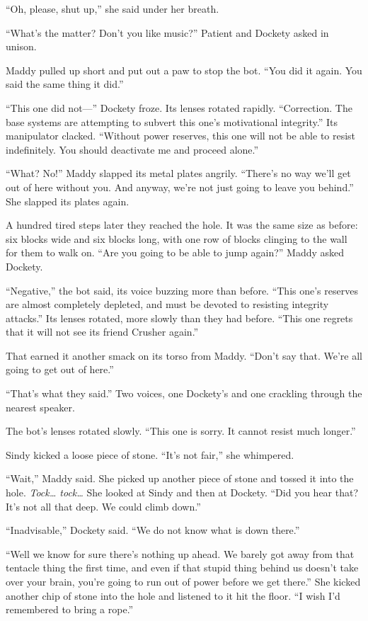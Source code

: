 \documentclass[10pt]{article}
\begin{document}
``Oh, please, shut up,'' she said under her breath.

``What's the matter? Don't you like music?'' Patient and Dockety asked
in unison.

Maddy pulled up short and put out a paw to stop the bot. ``You did it
again. You said the same thing it did.''

``This one did not---'' Dockety froze. Its lenses rotated rapidly.
``Correction. The base systems are attempting to subvert this one's
motivational integrity.'' Its manipulator clacked. ``Without power
reserves, this one will not be able to resist indefinitely. You should
deactivate me and proceed alone.''

``What? No!'' Maddy slapped its metal plates angrily. ``There's no way
we'll get out of here without you. And anyway, we're not just going to
leave you behind.'' She slapped its plates again.

A hundred tired steps later they reached the hole. It was the same size
as before: six blocks wide and six blocks long, with one row of blocks
clinging to the wall for them to walk on. ``Are you going to be able to
jump again?'' Maddy asked Dockety.

``Negative,'' the bot said, its voice buzzing more than before. ``This
one's reserves are almost completely depleted, and must be devoted to
resisting integrity attacks.'' Its lenses rotated, more slowly than they
had before. ``This one regrets that it will not see its friend Crusher
again.''

That earned it another smack on its torso from Maddy. ``Don't say that.
We're all going to get out of here.''

``That's what they said.'' Two voices, one Dockety's and one crackling
through the nearest speaker.

The bot's lenses rotated slowly. ``This one is sorry. It cannot resist
much longer.''

Sindy kicked a loose piece of stone. ``It's not fair,'' she whimpered.

``Wait,'' Maddy said. She picked up another piece of stone and tossed it
into the hole. \emph{Tock\ldots{} tock\ldots{}} She looked at Sindy and
then at Dockety. ``Did you hear that? It's not all that deep. We could
climb down.''

``Inadvisable,'' Dockety said. ``We do not know what is down there.''

``Well we know for sure there's nothing up ahead. We barely got away
from that tentacle thing the first time, and even if that stupid thing
behind us doesn't take over your brain, you're going to run out of power
before we get there.'' She kicked another chip of stone into the hole
and listened to it hit the floor. ``I wish I'd remembered to bring a
rope.''
\end{document}
